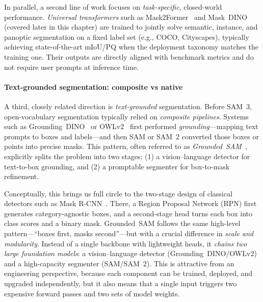 \begin{enrichment}
	\medskip
	\noindent In parallel, a second line of work focuses on \emph{task-specific}, closed-world performance. \emph{Universal transformers} such as Mask2Former~\cite{cheng2022_mask2former} and Mask~DINO~\cite{li2022_maskdino} (covered later in this chapter) are trained to jointly solve semantic, instance, and panoptic segmentation on a fixed label set (e.g., COCO, Cityscapes), typically achieving state-of-the-art mIoU/PQ when the deployment taxonomy matches the training one. Their outputs are directly aligned with benchmark metrics and do not require user prompts at inference time.
	
	\paragraph{Text-grounded segmentation: composite vs native}
	A third, closely related direction is \emph{text-grounded} segmentation. Before SAM~3, open-vocabulary segmentation typically relied on \emph{composite pipelines}. Systems such as Grounding~DINO~\cite{liu2023_groundingdino} or OWLv2~\cite{minderer2024_owlvitv2} first performed \emph{grounding}---mapping text prompts to boxes and labels---and then SAM or SAM~2 converted those boxes or points into precise masks. This pattern, often referred to as \emph{Grounded~SAM}~\cite{ren2024_groundedsam}, explicitly splits the problem into two stages: (1) a vision--language detector for text-to-box grounding, and (2) a promptable segmenter for box-to-mask refinement.
	
	Conceptually, this brings us full circle to the two-stage design of classical detectors such as Mask R-CNN~\cite{he2017_maskrcnn}. There, a Region Proposal Network (RPN) first generates category-agnostic boxes, and a second-stage head turns each box into class scores and a binary mask. Grounded~SAM follows the same high-level pattern---``boxes first, masks second''---but with a crucial difference in \emph{scale and modularity}. Instead of a single backbone with lightweight heads, it \emph{chains two large foundation models}: a vision--language detector (Grounding~DINO/OWLv2) and a high-capacity segmenter (SAM/SAM~2). This is attractive from an engineering perspective, because each component can be trained, deployed, and upgraded independently, but it also means that a single input triggers two expensive forward passes and two sets of model weights.
	

\end{enrichment}

